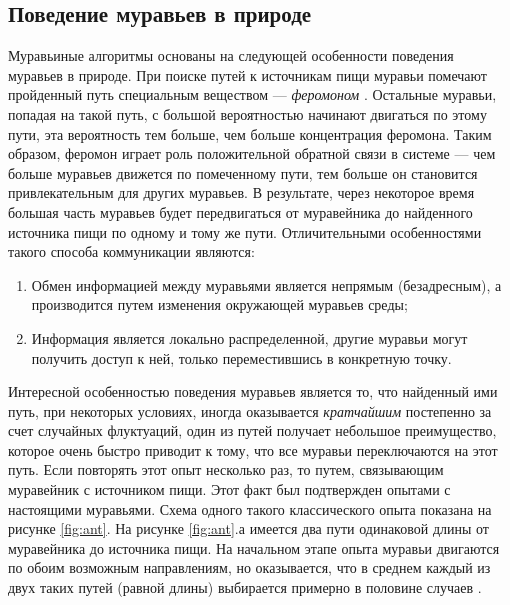 \subsection{Поведение муравьев в природе}
Муравьиные алгоритмы основаны на следующей особенности поведения муравьев в природе. При поиске путей к источникам пищи муравьи помечают пройденный путь специальным веществом --- \textit{феромоном} \cite{jason}. Остальные муравьи, попадая на такой путь, с большой вероятностью начинают
двигаться по этому пути, эта вероятность тем больше, чем больше концентрация феромона. Таким образом, феромон играет роль положительной обратной связи в системе --- чем больше муравьев движется по помеченному
пути, тем больше он становится привлекательным для других муравьев. В
результате, через некоторое время большая часть муравьев будет передвигаться от муравейника до найденного источника пищи по одному и тому же
пути.
Отличительными особенностями такого способа коммуникации являются:
\begin{enumerate}
	\item Обмен информацией между муравьями является непрямым (безадресным), а производится путем изменения окружающей муравьев среды;
	\item Информация является локально распределенной, другие муравьи могут получить доступ к ней, только переместившись в конкретную точку. 
\end{enumerate}


Интересной особенностью поведения муравьев является то, что найденный ими путь, при некоторых условиях, иногда оказывается \textit{кратчайшим}
постепенно за счет случайных флуктуаций, один из путей получает небольшое преимущество, которое очень быстро приводит к тому, что все муравьи
переключаются на этот путь. Если повторять этот опыт несколько раз, то
путем, связывающим муравейник с источником пищи. Этот факт был подтвержден опытами с настоящими муравьями. Схема одного такого классического опыта показана на рисунке \ref{fig:ant}. На рисунке \ref{fig:ant}.а имеется два пути одинаковой длины от муравейника до источника пищи. На начальном этапе опыта муравьи двигаются по обоим возможным направлениям, но
оказывается, что в среднем каждый из двух таких путей (равной длины)
выбирается примерно в половине случаев \cite{gorbunov}. 



